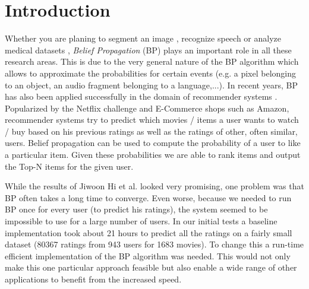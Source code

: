 
\section{Introduction}\label{sec:intro}

Whether you are planing to segment an image \cite{1544822}, recognize speech \cite{5373446} or analyze medical datasets \cite{bailly2011finding}, \textit{Belief Propagation} (BP) plays an important role in all these research areas. This is due to the very general nature of the BP algorithm which allows to approximate the probabilities for certain events (e.g. a pixel belonging to an object, an audio fragment belonging to a language,...). In recent years, BP has also been applied successfully in the domain of recommender systems \cite{Ha:2012:TRT:2396761.2398636}. Popularized by the Netflix challenge and E-Commerce shops such as Amazon, recommender systems try to predict which movies / items a user wants to watch / buy based on his previous ratings as well as the ratings of other, often similar, users. Belief propagation can be used to compute the probability of a user to like a particular item. Given these probabilities we are able to rank items and output the Top-N items for the given user.

 




While the results of Jiwoon Hi et al.\cite{Ha:2012:TRT:2396761.2398636} looked very promising, one problem was that BP often takes a long time to converge. Even worse, because we needed to run BP once for every user (to predict his ratings), the system seemed to be impossible to use for a large number of users. In our initial tests a baseline implementation took about 21 hours to predict all the ratings on a fairly small dataset (80367 ratings from 943 users for 1683 movies). To change this a run-time efficient implementation of the BP algorithm was needed.
This would not only make this one particular approach feasible but also enable a wide range of other applications to benefit from the increased speed.

